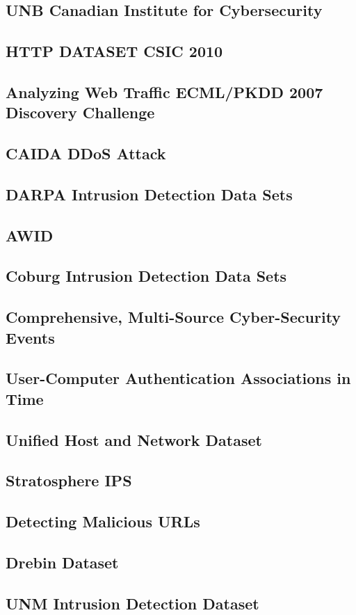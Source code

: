 \subsection{UNB Canadian Institute for Cybersecurity}

\subsection{HTTP DATASET CSIC 2010}

\subsection{Analyzing Web Traffic ECML/PKDD 2007 Discovery Challenge}

\subsection{CAIDA DDoS Attack}

\subsection{DARPA Intrusion Detection Data Sets}

\subsection{AWID}

\subsection{Coburg Intrusion Detection Data Sets}

\subsection{Comprehensive, Multi-Source Cyber-Security Events}

\subsection{User-Computer Authentication Associations in Time}

\subsection{Unified Host and Network Dataset}

\subsection{Stratosphere IPS}

\subsection{Detecting Malicious URLs}

\subsection{Drebin Dataset}

\subsection{UNM Intrusion Detection Dataset}